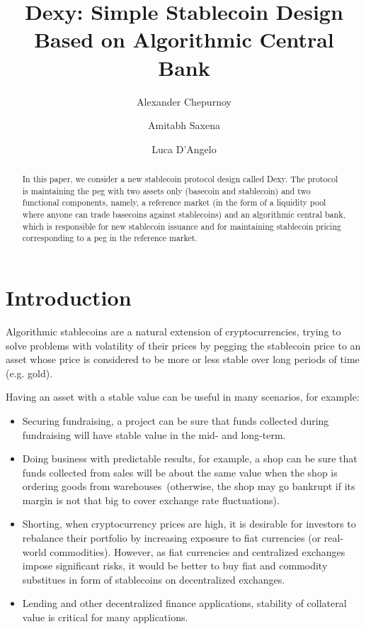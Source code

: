 \documentclass[a4paper,UKenglish,cleveref, autoref, thm-restate]{lipics-v2021}
\title{Dexy: Simple Stablecoin Design Based on Algorithmic Central Bank} %
\author{Alexander Chepurnoy{}}{Ergo Platform}{}{}{}%
\author{Amitabh Saxena{}}{Ergo Platform}{}{}{}%
\author{Luca D'Angelo{}}{zenGate Global \and The Stable Order}{}{}{}
\begin{document}
\maketitle

\begin{abstract}
In this paper, we consider a new stablecoin protocol design called Dexy. The protocol is maintaining the peg with two assets only (basecoin and stablecoin) and two functional components, namely, a reference market (in the form of a liquidity pool where anyone can trade basecoins against stablecoins) and an algorithmic central bank, which is responsible for new stablecoin issuance and for maintaining stablecoin pricing corresponding to a peg in the reference market.
\end{abstract}

\section{Introduction}
\label{sec:introduction}

Algorithmic stablecoins are a natural extension of cryptocurrencies, trying to 
solve problems with volatility of their prices by pegging the stablecoin price to an
asset whose price is considered to be more or less stable over long periods of time (e.g. gold).

Having an asset with a stable value can be useful in many scenarios, for example:
\begin{itemize}
\item Securing fundraising, a project can be sure that funds collected during fundraising will have stable value in the mid- and long-term.
\item Doing business with predictable results, for example, a shop can be sure that funds collected from sales will be about the same value when the shop is ordering goods from warehouses~(otherwise, the shop may go bankrupt if its margin is not that big to cover exchange rate fluctuations). 
\item Shorting, when cryptocurrency prices are high, it is desirable for investors to rebalance their portfolio by increasing exposure to fiat currencies (or real-world commodities). However, as fiat currencies and centralized exchanges impose significant risks, it would be better to buy fiat and commodity substitues in form of stablecoins on decentralized exchanges.
\item Lending and other decentralized finance applications, stability of collateral value is critical for many applications.
\end{itemize}
\end{document}
